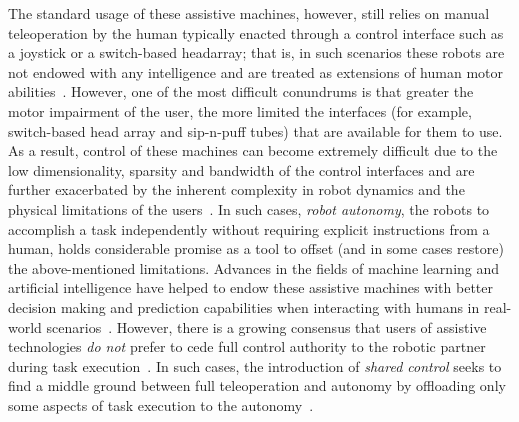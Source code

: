 \documentclass[12pt]{article}
\begin{document}
%
%
The standard usage of these assistive machines, however, still relies on manual teleoperation by the human typically enacted through a control interface such as a joystick or a switch-based headarray; that is, in such scenarios these robots are not endowed with any intelligence and are treated as extensions of human motor abilities~\cite{simpson2008tooth}. However, one of the most difficult conundrums is that greater the motor impairment of the user, the more limited the interfaces (for example, switch-based head array and sip-n-puff tubes) that are available for them to use. As a result, control of these machines can become extremely difficult due to the low dimensionality, sparsity and bandwidth of the control interfaces and are further exacerbated by the inherent complexity in robot dynamics and the physical limitations of the users~\cite{pilarski2012dynamic}.
In such cases, \textit{robot autonomy}, the  robots to accomplish a task independently without requiring explicit instructions from a human, holds considerable promise as a tool to offset (and in some cases restore) the above-mentioned limitations. Advances in the fields of machine learning and artificial intelligence have helped to endow these assistive machines with better decision making and prediction capabilities when interacting with humans in real-world scenarios~\cite{huang2015using}.
However, there is a growing consensus that users of assistive technologies \textit{do not} prefer to cede full control authority to the robotic partner during task execution~\cite{gopinath2017human}. In such cases, the introduction of \textit{shared control} seeks to find a middle ground between full teleoperation and autonomy by offloading only some aspects of task execution to the autonomy~\cite{wasson2003user, demeester2008user}. 
\end{document}

